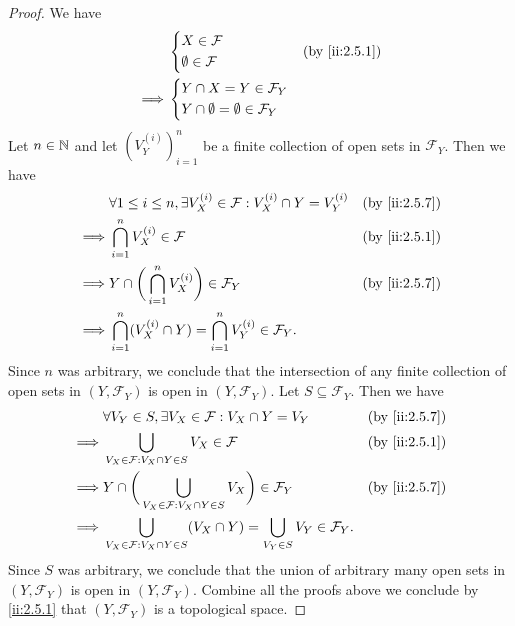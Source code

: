 \begin{proof}
  We have
  \begin{align*}
             & \begin{dcases}
                 X \in \mathcal{F} \\
                 \emptyset \in \mathcal{F}
               \end{dcases}                      &  & \by{ii:2.5.1} \\
    \implies & \begin{dcases}
                 Y \cap X = Y \in \mathcal{F}_Y \\
                 Y \cap \emptyset = \emptyset \in \mathcal{F}_Y
               \end{dcases}
  \end{align*}
  Let \(n \in \mathbb{N}\) and let \((V_Y^{(i)})_{i = 1}^n\) be a finite collection of open sets in \(\mathcal{F}_Y\).
  Then we have
  \begin{align*}
             & \forall 1 \leq i \leq n, \exists V_X^{(i)} \in \mathcal{F} : V_X^{(i)} \cap Y = V_Y^{(i)} &  & \by{ii:2.5.7} \\
    \implies & \bigcap_{i = 1}^n V_X^{(i)} \in \mathcal{F}                                               &  & \by{ii:2.5.1} \\
    \implies & Y \cap \bigg(\bigcap_{i = 1}^n V_X^{(i)}\bigg) \in \mathcal{F}_Y                          &  & \by{ii:2.5.7} \\
    \implies & \bigcap_{i = 1}^n (V_X^{(i)} \cap Y) = \bigcap_{i = 1}^n V_Y^{(i)} \in \mathcal{F}_Y.
  \end{align*}
  Since \(n\) was arbitrary, we conclude that the intersection of any finite collection of open sets in \((Y, \mathcal{F}_Y)\) is open in \((Y, \mathcal{F}_Y)\).
  Let \(S \subseteq \mathcal{F}_Y\).
  Then we have
  \begin{align*}
             & \forall V_Y \in S, \exists V_X \in \mathcal{F} : V_X \cap Y = V_Y                                          &  & \by{ii:2.5.7} \\
    \implies & \bigcup_{V_X \in \mathcal{F} : V_X \cap Y \in S} V_X \in \mathcal{F}                                       &  & \by{ii:2.5.1} \\
    \implies & Y \cap \bigg(\bigcup_{V_X \in \mathcal{F} : V_X \cap Y \in S} V_X\bigg) \in \mathcal{F}_Y                  &  & \by{ii:2.5.7} \\
    \implies & \bigcup_{V_X \in \mathcal{F} : V_X \cap Y \in S} (V_X \cap Y) = \bigcup_{V_Y \in S} V_Y \in \mathcal{F}_Y.
  \end{align*}
  Since \(S\) was arbitrary, we conclude that the union of arbitrary many open sets in \((Y, \mathcal{F}_Y)\) is open in \((Y, \mathcal{F}_Y)\).
  Combine all the proofs above we conclude by \cref{ii:2.5.1} that \((Y, \mathcal{F}_Y)\) is a topological space.
\end{proof}

